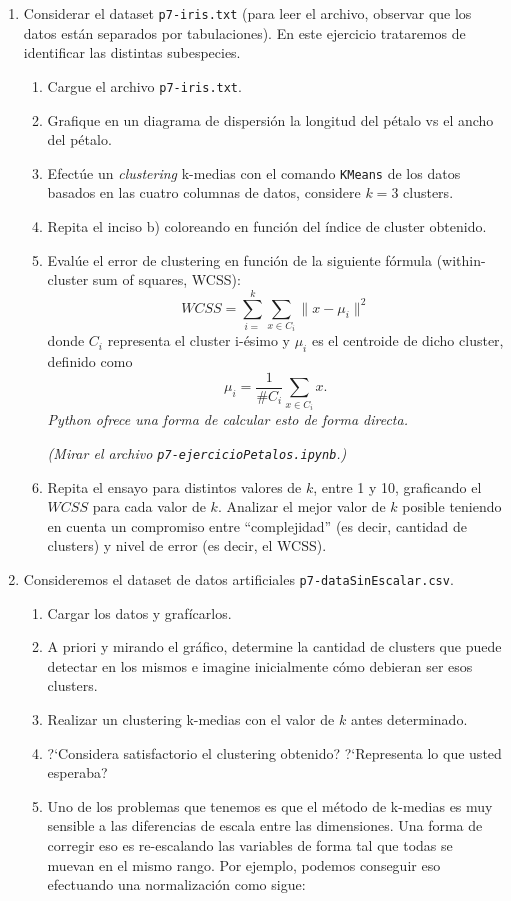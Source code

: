 \documentclass[a4paper,11pt]{article}
\theoremstyle{definition}
\begin{document}
\begin{enumerate}
\item Considerar el dataset \texttt{p7-iris.txt} (para leer el archivo, observar que los datos est\'an separados por tabulaciones). En este ejercicio trataremos de identificar las distintas subespecies.
\begin{enumerate}
	\item Cargue el archivo \texttt{p7-iris.txt}.
	\item Grafique en un diagrama de dispersi\'on la longitud del p\'etalo vs el ancho del p\'etalo.
	\item Efect\'ue un \textit{clustering} k-medias con el comando \texttt{KMeans} de los datos basados en las cuatro columnas de datos, considere $k=3$ clusters.
	\item Repita el inciso b) coloreando en funci\'on del \'indice de cluster obtenido.
	\item Eval\'ue el error de clustering en funci\'on de la siguiente f\'ormula (within-cluster sum of squares, WCSS):
	$$
	WCSS = \sum_{i=}^k \sum_{x \in C_i} \| x - \mu_i\|^2
	$$
	donde $C_i$ representa el cluster i-\'esimo y $\mu_i$ es el centroide de dicho cluster, definido como
	$$
	\mu_i = \frac{1}{\#C_i}\sum_{x \in C_i} x.
	$$
	\textit{Python ofrece una forma de calcular esto de forma directa.}
	
	 \textit{(Mirar el archivo \texttt{p7-ejercicioPetalos.ipynb}.)}
	\item Repita el ensayo para distintos valores de $k$, entre 1 y 10, graficando el $WCSS$ para cada valor de $k$. Analizar el mejor valor de $k$ posible teniendo en cuenta
	un compromiso entre ``complejidad'' (es decir, cantidad de clusters) y nivel de error (es decir, el WCSS).
	
\end{enumerate}




\item Consideremos el dataset de datos artificiales \texttt{p7-dataSinEscalar.csv}.
\begin{enumerate}
	\item Cargar los datos  y graf\'icarlos.
	\item A priori y mirando el gr\'afico, determine la cantidad de clusters que puede detectar en los mismos e imagine inicialmente c\'omo debieran ser esos clusters.
	\item Realizar un clustering k-medias con el valor de $k$ antes determinado.
	\item ?`Considera satisfactorio el clustering obtenido? ?`Representa lo que usted esperaba?
	\item Uno de los problemas que tenemos es que el m\'etodo de k-medias es muy sensible a las diferencias de escala entre las dimensiones. Una forma de corregir eso es re-escalando las variables de
	forma tal que todas se muevan en el mismo rango. Por ejemplo, podemos conseguir eso efectuando una normalizaci\'on como sigue:
	

\end{enumerate}
\end{enumerate}
\end{document}
